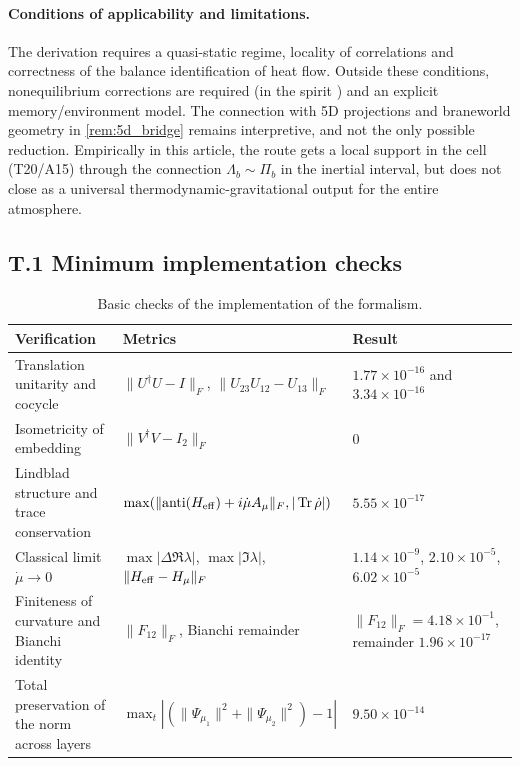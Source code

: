 \documentclass[11pt,a4paper]{article}
\DeclareMathOperator{\Tr}{Tr}
\theoremstyle{definition}
\theoremstyle{plain}
\theoremstyle{remark}
\begin{document}
\paragraph{Conditions of applicability and limitations.}
The derivation requires a quasi-static regime, locality of correlations and correctness of the balance identification of heat flow.
Outside these conditions, nonequilibrium corrections are required (in the spirit \cite{ElingGuedensJacobson2009NonEq}) and an explicit memory/environment model.
The connection with 5D projections and braneworld geometry in \cref{rem:5d_bridge} remains interpretive,
and not the only possible reduction.
Empirically in this article, the route gets a local support in the cell (T20/A15) through the connection \(\Lambda_b\sim\Pi_b\) in the inertial interval, but does not close as a universal thermodynamic-gravitational output for the entire atmosphere.

\subsection*{T.1 Minimum implementation checks}

\begin{table}[H]
\centering
\caption{Basic checks of the implementation of the formalism.}
\label{tab:appendix_t_impl}
\small
\begin{tabular}{@{}p{4.8cm}p{4.1cm}p{5.1cm}@{}}
\toprule
Verification & Metrics & Result \\
\midrule
Translation unitarity and cocycle & $\|U^\dagger U-I\|_F$, $\|U_{23}U_{12}-U_{13}\|_F$ & $1.77\times10^{-16}$ and $3.34\times10^{-16}$ \\
Isometricity of embedding & $\|V^\dagger V-I_2\|_F$ & $0$ \\
Lindblad structure and trace conservation & $\max(\|{\rm anti}(H_{\rm eff})+i\dot\mu A_\mu\|_F,|\Tr\dot\rho|)$ & $5.55\times10^{-17}$ \\
Classical limit $\dot\mu\to 0$ & $\max|\Delta\Re\lambda|$, $\max|\Im\lambda|$, $\|H_{\rm eff}-H_\mu\|_F$ & $1.14\times10^{-9}$, $2.10\times10^{-5}$, $6.02\times10^{-5}$ \\
Finiteness of curvature and Bianchi identity & $\|F_{12}\|_F$, Bianchi remainder & $\|F_{12}\|_F=4.18\times10^{-1}$, remainder $1.96\times10^{-17}$ \\
Total preservation of the norm across layers & $\max_t|(\|\Psi_{\mu_1}\|^2+\|\Psi_{\mu_2}\|^2)-1|$ & $9.50\times10^{-14}$ \\
\bottomrule
\end{tabular}
\end{table}
\end{document}
